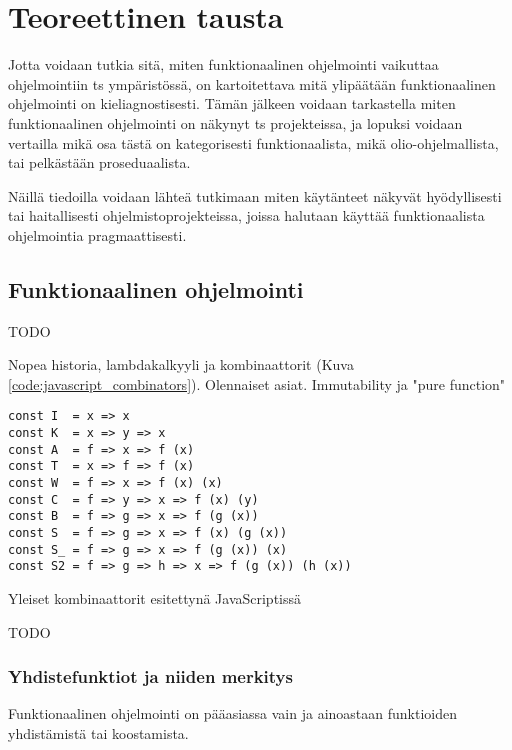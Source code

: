 \vspace{21.5pt}
\chapter{Teoreettinen tausta}

Jotta voidaan tutkia sitä, miten funktionaalinen ohjelmointi vaikuttaa ohjelmointiin \gls{ts} ympäristössä, on kartoitettava mitä ylipäätään funktionaalinen ohjelmointi on kieliagnostisesti. Tämän jälkeen voidaan tarkastella miten funktionaalinen ohjelmointi on näkynyt \gls{ts} projekteissa, ja lopuksi voidaan vertailla mikä osa tästä on kategorisesti funktionaalista, mikä olio-ohjelmallista, tai pelkästään proseduaalista.

Näillä tiedoilla voidaan lähteä tutkimaan miten käytänteet näkyvät hyödyllisesti tai haitallisesti ohjelmistoprojekteissa, joissa halutaan käyttää funktionaalista ohjelmointia pragmaattisesti.

\section{Funktionaalinen ohjelmointi}

TODO

Nopea historia, lambdakalkyyli ja kombinaattorit (Kuva \ref{code:javascript_combinators}). Olennaiset asiat. Immutability ja "pure function"

\begin{code}
  \begin{verbatim}
const I  = x => x
const K  = x => y => x
const A  = f => x => f (x)
const T  = x => f => f (x)
const W  = f => x => f (x) (x)
const C  = f => y => x => f (x) (y)
const B  = f => g => x => f (g (x))
const S  = f => g => x => f (x) (g (x))
const S_ = f => g => x => f (g (x)) (x)
const S2 = f => g => h => x => f (g (x)) (h (x))
\end{verbatim}
  \caption{Yleiset kombinaattorit esitettynä JavaScriptissä \cite{javascript_combinators}}
  \label{code:javascript_combinators}
\end{code}

TODO

\subsection{Yhdistefunktiot ja niiden merkitys}

Funktionaalinen ohjelmointi on pääasiassa vain ja ainoastaan funktioiden yhdistämistä tai koostamista.

